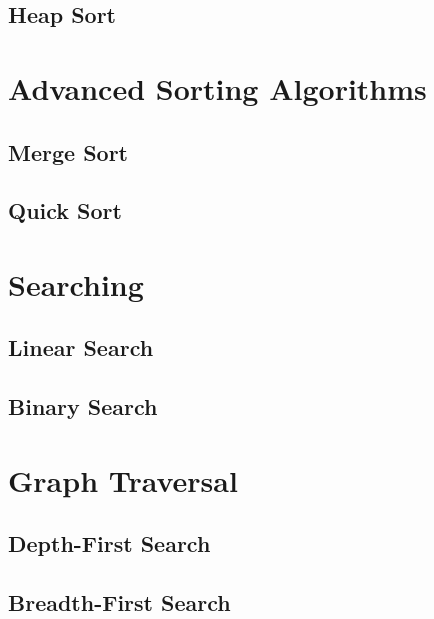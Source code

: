 \documentclass[10pt, 
a4paper, 
oneside, 
headinclude, footinclude, 
BCOR5mm]
{scrartcl}
\begin{document}
\subsection{Heap Sort}
\newpage
\section{Advanced Sorting Algorithms}
\subsection{Merge Sort}
\newpage
\subsection{Quick Sort}
\newpage

\section{Searching}
\subsection{Linear Search}
\newpage
\subsection{Binary Search}
\newpage

\section{Graph Traversal}
\subsection{Depth-First Search}
\newpage
\subsection{Breadth-First Search}
\newpage
\end{document}
